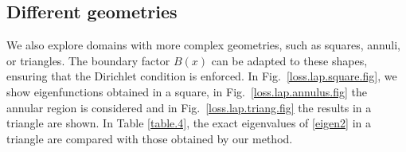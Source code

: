 \documentclass[reprint,superscriptaddress,aps,prl]{revtex4-2}
\begin{document}












\subsection{Different geometries}
We also explore domains with more complex geometries, such as squares, annuli, or triangles. The boundary factor $B(x)$ can be adapted to these shapes, ensuring that the Dirichlet condition is enforced. In Fig.~\ref{loss.lap.square.fig}, we show eigenfunctions obtained in a square, in Fig.~\ref{loss.lap.annulus.fig}  the annular region is considered and in Fig.~\ref{loss.lap.triang.fig} the results in a triangle are shown.  
In Table \ref{table.4},  the exact eigenvalues of \eqref{eigen2} in a triangle are compared with those obtained by our method. 

\end{document}
